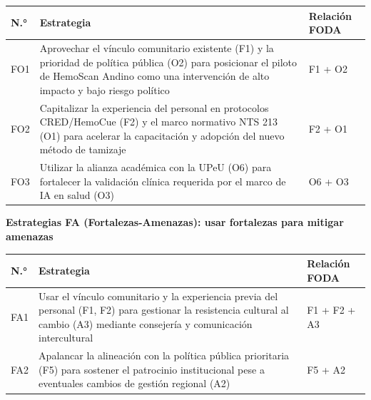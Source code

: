 \documentclass[11pt,a4paper]{article}
\begin{document}
{\small
\begin{longtable}[]{@{}
  >{\raggedright\arraybackslash}p{}
  >{\raggedright\arraybackslash}p{}
  >{\raggedright\arraybackslash}p{}@{}}
\toprule\noalign{}
\begin{minipage}[b]{\linewidth}\raggedright
N.°
\end{minipage} & \begin{minipage}[b]{\linewidth}\raggedright
Estrategia
\end{minipage} & \begin{minipage}[b]{\linewidth}\raggedright
Relación FODA
\end{minipage} \\
\midrule\noalign{}
\endhead
\bottomrule\noalign{}
\endlastfoot
FO1 & Aprovechar el vínculo comunitario existente (F1) y la prioridad de política pública (O2) para posicionar el piloto de HemoScan Andino como una intervención de alto impacto y bajo riesgo político & F1 + O2 \\
FO2 & Capitalizar la experiencia del personal en protocolos CRED/HemoCue (F2) y el marco normativo NTS 213 (O1) para acelerar la capacitación y adopción del nuevo método de tamizaje & F2 + O1 \\
FO3 & Utilizar la alianza académica con la UPeU (O6) para fortalecer la validación clínica requerida por el marco de IA en salud (O3) & O6 + O3 \\
\end{longtable}
}

\textbf{Estrategias FA (Fortalezas-Amenazas): usar fortalezas para mitigar amenazas}

{\small
\begin{longtable}[]{@{}
  >{\raggedright\arraybackslash}p{}
  >{\raggedright\arraybackslash}p{}
  >{\raggedright\arraybackslash}p{}@{}}
\toprule\noalign{}
\begin{minipage}[b]{\linewidth}\raggedright
N.°
\end{minipage} & \begin{minipage}[b]{\linewidth}\raggedright
Estrategia
\end{minipage} & \begin{minipage}[b]{\linewidth}\raggedright
Relación FODA
\end{minipage} \\
\midrule\noalign{}
\endhead
\bottomrule\noalign{}
\endlastfoot
FA1 & Usar el vínculo comunitario y la experiencia previa del personal (F1, F2) para gestionar la resistencia cultural al cambio (A3) mediante consejería y comunicación intercultural & F1 + F2 + A3 \\
FA2 & Apalancar la alineación con la política pública prioritaria (F5) para sostener el patrocinio institucional pese a eventuales cambios de gestión regional (A2) & F5 + A2 \\
\end{longtable}
}
\end{document}
